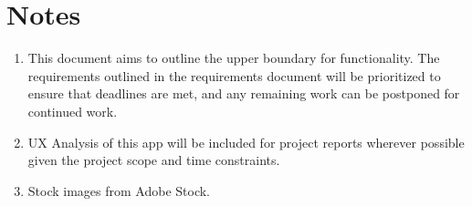 \documentclass{report}
\begin{document}
\chapter*{Notes}
\begin{enumerate}
  \item This document aims to outline the upper boundary for functionality. The requirements outlined in the requirements document will be prioritized to ensure that deadlines are met, and any remaining work can be postponed for continued work.
  \item UX Analysis of this app will be included for project reports wherever possible given the project scope and time constraints.
  \item Stock images from Adobe Stock.
\end{enumerate}
\end{document}
